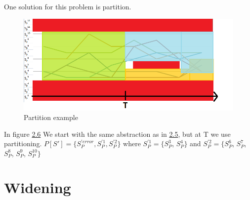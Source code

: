 One solution for this problem is partition.

 \begin{figure} [!ht]
	\centering
	\includegraphics[width=150mm, keepaspectratio]{figures/trajectory8.png}
	\caption{\label{fig:trajectory8}Partition example}
\end{figure}

 In figure \hyperref[fig:trajectory7]{2.6} We start with the same abstraction as in \hyperref[fig:trajectory7]{2.5}, but at T we use partitioning. $P[S']=\{S_{P}^{'error}, S_{P}^{'1} , S_{P}^{'2}\}$ where $S_{P}^{'1}=\{S_{P}^{3}$, $S_{P}^{4}\}$ and $S_{P}^{'2}=\{S_{P}^{6}$, $S_{P}^{7}$, $S_{P}^{8}$, $S_{P}^{9}$, $S_{P}^{10}\}$

\section{Widening}
\label{sec:widening}



